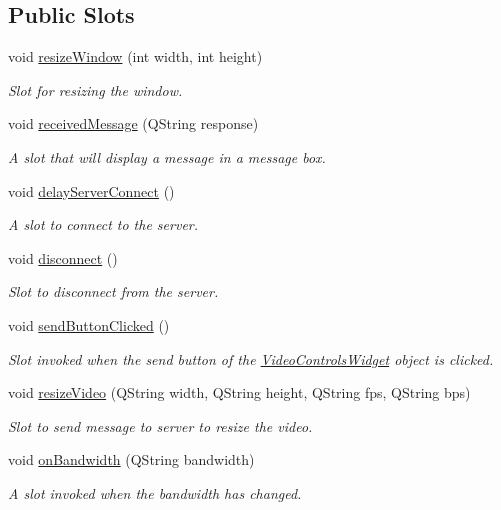 \subsection*{Public Slots}
\begin{DoxyCompactItemize}
\item 
void \hyperlink{classVideoWindow_a5035f10be178cfc311d637c19938a344}{resize\-Window} (int width, int height)
\begin{DoxyCompactList}\small\item\em Slot for resizing the window. \end{DoxyCompactList}\item 
void \hyperlink{classVideoWindow_ab25ad37e9dfdb92f46212d4309d4232f}{received\-Message} (Q\-String response)
\begin{DoxyCompactList}\small\item\em A slot that will display a message in a message box. \end{DoxyCompactList}\item 
void \hyperlink{classVideoWindow_a55220de4b6b3b8e2575201c933932059}{delay\-Server\-Connect} ()
\begin{DoxyCompactList}\small\item\em A slot to connect to the server. \end{DoxyCompactList}\item 
void \hyperlink{classVideoWindow_a68b4f26c999360c30b12cc70347393c7}{disconnect} ()
\begin{DoxyCompactList}\small\item\em Slot to disconnect from the server. \end{DoxyCompactList}\item 
void \hyperlink{classVideoWindow_a655194e6449c76e200135c88f8fafd7d}{send\-Button\-Clicked} ()
\begin{DoxyCompactList}\small\item\em Slot invoked when the send button of the \hyperlink{classVideoControlsWidget}{Video\-Controls\-Widget} object is clicked. \end{DoxyCompactList}\item 
void \hyperlink{classVideoWindow_ac07f4db8a805849174cb129134708fd4}{resize\-Video} (Q\-String width, Q\-String height, Q\-String fps, Q\-String bps)
\begin{DoxyCompactList}\small\item\em Slot to send message to server to resize the video. \end{DoxyCompactList}\item 
void \hyperlink{classVideoWindow_ac8f9d111de984604f029eec9d71ced83}{on\-Bandwidth} (Q\-String bandwidth)
\begin{DoxyCompactList}\small\item\em A slot invoked when the bandwidth has changed. \end{DoxyCompactList}\end{DoxyCompactItemize}
